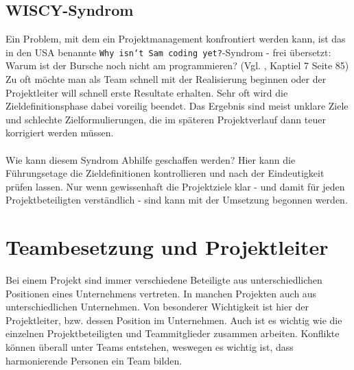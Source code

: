 \documentclass[12pt]{scrartcl}
\begin{document}
\subsection{WISCY-Syndrom}
\label{wiscy_syndrom}
Ein Problem, mit dem ein Projektmanagement konfrontiert werden kann, ist das in den USA benannte \texttt{Why isn`t Sam coding yet?}-Syndrom - frei übersetzt: Warum ist der Bursche noch nicht am programmieren? (Vgl. \cite{proj_zum_erfolg_fuehren}, Kaptiel 7 Seite 85) \\
Zu oft möchte man als Team schnell mit der Realisierung beginnen oder der Projektleiter will schnell erste Resultate erhalten. Sehr oft wird die Zieldefinitionsphase dabei voreilig beendet. Das Ergebnis sind meist unklare Ziele und schlechte Zielformulierungen, die im späteren Projektverlauf dann teuer korrigiert werden müssen.\\
\\
Wie kann diesem Syndrom Abhilfe geschaffen werden? Hier kann die Führungsetage die Zieldefinitionen kontrollieren und nach der Eindeutigkeit prüfen lassen. Nur wenn gewissenhaft die Projektziele klar - und damit für jeden Projektbeteiligten verständlich - sind kann mit der Umsetzung begonnen werden.

\pagebreak
\section{Teambesetzung und Projektleiter}
Bei einem Projekt sind immer verschiedene Beteiligte aus unterschiedlichen Positionen eines Unternehmens vertreten. In manchen Projekten auch aus unterschiedlichen Unternehmen. Von besonderer Wichtigkeit ist hier der Projektleiter, bzw. dessen Position im Unternehmen. Auch ist es wichtig wie die einzelnen Projektbeteiligten und Teammitglieder zusammen arbeiten. Konflikte können überall unter Teams entstehen, weswegen es wichtig ist, dass harmonierende Personen ein Team bilden. 
\end{document}
